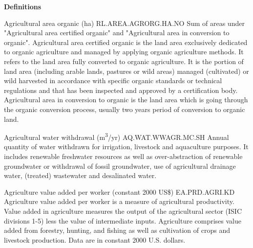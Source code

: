 \begin{MetadataCollection}

\twocolumn

\LARGE

\textbf{Definitions}

\footnotesize

\begin{metadata}{ Agricultural area organic (ha) }{ RL.AREA.AGRORG.HA.NO }
Sum of areas under "Agricultural area certified organic" and "Agricultural area in conversion to organic". Agricultural area certified organic is the land area exclusively dedicated to organic agriculture and managed by applying organic agriculture methods. It refers to the land area fully converted to organic agriculture. It is the portion of land area (including arable lands, pastures or wild areas) managed (cultivated) or wild harvested in accordance with specific organic standards or technical regulations and that has been inspected and approved by a certification body. Agricultural area in conversion to organic is the land area which is going through the organic conversion process, usually two years period of conversion to organic land. 
\end{metadata}

\begin{metadata}{ Agricultural water withdrawal (m\textsuperscript{3}/yr) }{ AQ.WAT.WWAGR.MC.SH }
Annual quantity of water withdrawn for irrigation, livestock and aquaculture purposes. It includes renewable freshwater resources as well as over-abstraction of renewable groundwater or withdrawal of fossil groundwater, use of agricultural drainage water, (treated) wastewater and desalinated water. 
\end{metadata}

\begin{metadata}{ Agriculture value added per worker (constant 2000 US\$) }{ EA.PRD.AGRI.KD }
Agriculture value added per worker is a measure of agricultural productivity. Value added in agriculture measures the output of the agricultural sector (ISIC divisions 1-5) less the value of intermediate inputs. Agriculture comprises value added from forestry, hunting, and fishing as well as cultivation of crops and livestock production. Data are in constant 2000 U.S. dollars. 
\end{metadata}


\end{MetadataCollection}
